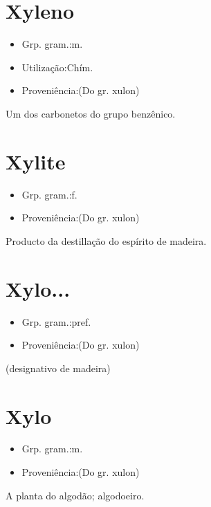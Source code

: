 \section{Xyleno}
\begin{itemize}
\item {Grp. gram.:m.}
\end{itemize}
\begin{itemize}
\item {Utilização:Chím.}
\end{itemize}
\begin{itemize}
\item {Proveniência:(Do gr. \textunderscore xulon\textunderscore )}
\end{itemize}
Um dos carbonetos do grupo benzênico.
\section{Xylite}
\begin{itemize}
\item {Grp. gram.:f.}
\end{itemize}
\begin{itemize}
\item {Proveniência:(Do gr. \textunderscore xulon\textunderscore )}
\end{itemize}
Producto da destillação do espírito de madeira.
\section{Xylo...}
\begin{itemize}
\item {Grp. gram.:pref.}
\end{itemize}
\begin{itemize}
\item {Proveniência:(Do gr. \textunderscore xulon\textunderscore )}
\end{itemize}
(designativo de \textunderscore madeira\textunderscore )
\section{Xylo}
\begin{itemize}
\item {Grp. gram.:m.}
\end{itemize}
\begin{itemize}
\item {Proveniência:(Do gr. \textunderscore xulon\textunderscore )}
\end{itemize}
A planta do algodão; algodoeiro.
